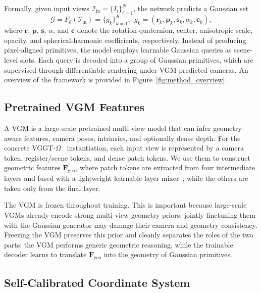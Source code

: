\documentclass[letterpaper]{article} %
\begin{document}
Formally, given input views $\mathcal{I}_{\mathrm{in}}=\{I_i\}_{i=1}^{N}$, the network predicts a Gaussian set
\begin{equation}
    \mathcal{G}
    =
    F_{\theta}(\mathcal{I}_{\mathrm{in}})
    =
    \{g_k\}_{k=1}^{K},
    \ \ 
    g_k
    =
    (\mathbf{r}_k,\mathbf{p}_k,\mathbf{s}_k,\alpha_k,\mathbf{c}_k),
\end{equation}
where $\mathbf{r}$, $\mathbf{p}$, $\mathbf{s}$, $\alpha$, and $\mathbf{c}$ denote the rotation quaternion, center, anisotropic scale, opacity, and spherical-harmonic coefficients, respectively. Instead of producing pixel-aligned primitives, the model employs learnable Gaussian queries as scene-level slots. Each query is decoded into a group of Gaussian primitives, which are supervised through differentiable rendering under VGM-predicted cameras. An overview of the framework is provided in Figure~\ref{fig:method_overview}.


\subsection{Pretrained VGM Features}
\label{sec:frozen_vgm}

A VGM is a large-scale pretrained multi-view model that can infer geometry-aware features, camera poses, intrinsics, and optionally dense depth. For the concrete VGGT-$\Omega$~\cite{wang2026vggtomega} instantiation, each input view is represented by a camera token, register/scene tokens, and dense patch tokens. We use them to construct geometric features $\mathbf{F}_{\mathrm{geo}}$, where patch tokens are extracted from four intermediate layers and fused with a lightweight learnable layer mixer~\cite{cao2026vggtdet}, while the others are taken only from the final layer.

The VGM is frozen throughout training. This is important because large-scale VGMs already encode strong multi-view geometry priors; jointly finetuning them with the Gaussian generator may damage their camera and geometry consistency. Freezing the VGM preserves this prior and cleanly separates the roles of the two parts: the VGM performs generic geometric reasoning, while the trainable decoder learns to translate $\mathbf{F}_{\mathrm{geo}}$ into the geometry of Gaussian primitives.

\subsection{Self-Calibrated Coordinate System}
\label{sec:vgm_native_coords}
\end{document}
